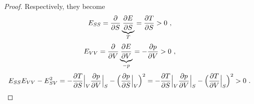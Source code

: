 \begin{proof}
        Respectively, they become 
        \begin{equation*}
            E_{SS} = \frac{\partial}{\partial S} \underbrace{\frac{\partial E}{\partial S}}_{T} = \frac{\partial T}{\partial S} > 0 ~,
        \end{equation*}
        \begin{equation*}
            E_{VV} = \frac{\partial}{\partial V} \underbrace{\frac{\partial E}{\partial V}}_{-p} = - \frac{\partial p}{\partial V} > 0 ~,
        \end{equation*}
        \begin{equation*}
            E_{SS}E_{VV} - E^2_{SV} = - \frac{\partial T}{\partial S} \Big \vert_V \frac{\partial p}{\partial V} \Big \vert_S - \Big ( \frac{\partial p}{\partial S} \Big \vert_V \Big )^2 = - \frac{\partial T}{\partial S} \Big \vert_V \frac{\partial p}{\partial V} \Big \vert_S - \Big ( \frac{\partial T}{\partial V} \Big \vert_S \Big )^2 > 0 ~.
        \end{equation*}
    \end{proof}

